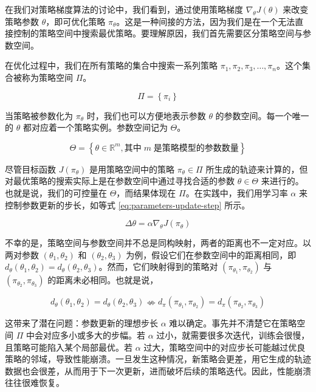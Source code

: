 \documentclass[lang=cn,newtx,10pt,scheme=chinese]{elegantbook}
\begin{document}
在我们对策略梯度算法的讨论中，我们看到，通过使用策略梯度 $\nabla_{\theta}J(\theta)$ 来改变策略参数 $\theta$，即可优化策略 $\pi_{\theta}$。这是一种间接的方法，因为我们是在一个无法直接控制的策略空间中搜索最优策略。要理解原因，我们首先需要区分策略空间与参数空间。

在优化过程中，我们在所有策略的集合中搜索一系列策略 $\pi_{1}, \pi_{2}, \pi_{3},\dots,\pi_{n}$。这个集合被称为策略空间 $\Pi$。

\begin{equation}\label{eq:policy-space}
\Pi = \left\{ \pi_{i} \right\} 
\end{equation}

当策略被参数化为 $\pi_{\theta}$ 时，我们也可以方便地表示参数 $\theta$ 的参数空间。每一个唯一的 $\theta$ 都对应着一个策略实例。参数空间记为 $\Theta$。

\begin{equation}\label{eq:parameters-space}
\Theta=\left\{ \theta\in \mathbb{R}^m, \text{其中}\; m \;\text{是策略模型的参数数量} \right\} 
\end{equation}

尽管目标函数 $J(\pi_{\theta})$ 是用策略空间中的策略 $\pi_{\theta}\in\Pi$ 所生成的轨迹来计算的，但对最优策略的搜索实际上是在参数空间中通过寻找合适的参数 $\theta\in\Theta$ 来进行的。也就是说，我们的可控量在 $\Theta$，而结果体现在 $\Pi$。在实践中，我们用学习率 $\alpha$ 来控制参数更新的步长，如等式 \ref{eq:parameters-update-step} 所示。

\begin{equation}\label{eq:parameters-update-step}
\Delta\theta=\alpha \nabla _{\theta}J(\pi_{\theta})
\end{equation}

不幸的是，策略空间与参数空间并不总是同构映射，两者的距离也不一定对应。以两对参数 $(\theta_{1},\theta_{2})$ 和 $(\theta_{2},\theta_{3})$ 为例，假设它们在参数空间中的距离相同，即 $d_{\theta}(\theta_{1},\theta_{2})=d_{\theta}(\theta_{2},\theta_{3})$。然而，它们映射得到的策略对 $(\pi_{\theta_{1}},\pi_{\theta_{2}})$ 与 $(\pi_{\theta_{2}}, \pi_{\theta_{3}})$ 的距离未必相同。也就是说，

\begin{equation}
d_{\theta}(\theta_{1},\theta_{2})=d_{\theta}(\theta_{2},\theta_{3})\nLeftrightarrow d_{\pi}(\pi_{\theta_{1}},\pi_{\theta_{2}})=d_{\pi}(\pi_{\theta_{2}},\pi_{\theta_{3}})
\end{equation}

这带来了潜在问题：参数更新的理想步长 $\alpha$ 难以确定。事先并不清楚它在策略空间 $\Pi$ 中会对应多小或多大的步幅。若 $\alpha$ 过小，就需要很多次迭代，训练会很慢，且策略可能陷入某个局部最优。若 $\alpha$ 过大，策略空间中的对应步长可能越过优良策略的邻域，导致性能崩溃。一旦发生这种情况，新策略会更差，用它生成的轨迹数据也会很差，从而用于下一次更新，进而破坏后续的策略迭代。因此，性能崩溃往往很难恢复。
\end{document}
